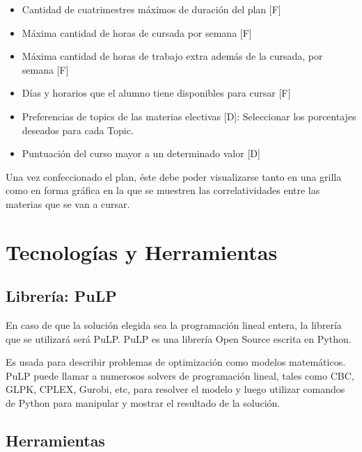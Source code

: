 \documentclass[a4paper]{article}
\begin{document}
\begin{itemize}
	\item Cantidad de cuatrimestres máximos de duración del plan [F]
	\item Máxima cantidad de horas de cursada por semana [F]
	\item Máxima cantidad de horas de trabajo extra además de la cursada, por semana [F]
	\item Días y horarios que el alumno tiene disponibles para cursar [F]
	\item Preferencias de topics de las materias electivas [D]: Seleccionar los porcentajes deseados para cada Topic.
	\item Puntuación del curso mayor a un determinado valor [D]	
\end{itemize}

Una vez confeccionado el plan, éste debe poder visualizarse tanto en una grilla como en forma gráfica en la que se muestren las correlatividades entre las materias que se van a cursar.

\section{Tecnologías y Herramientas}

\subsection{Librería: PuLP}

En caso de que la solución elegida sea la programación lineal entera, la librería que se utilizará será PuLP. PuLP es una librería Open Source escrita en Python.

Es usada para describir problemas de optimización como modelos matemáticos. PuLP puede llamar a numerosos solvers de programación lineal, tales como CBC, GLPK, CPLEX, Gurobi, etc, para resolver el modelo y luego utilizar comandos de Python para manipular y mostrar el resultado de la solución.

\subsection{Herramientas}
\end{document}
